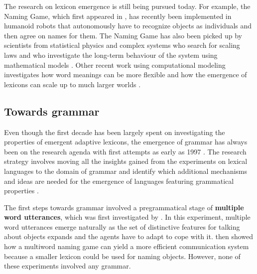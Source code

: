 The research on lexicon emergence is still being pursued today. For example, the Naming Game, which first appeared in \citet{steels97selforganizing}, has recently been implemented in humanoid robots that autonomously have to recognize objects as individuals and then agree on names for them. The Naming Game has also been picked up by scientists from statistical physics and complex systems who search for scaling laws and who investigate the long-term behaviour of the system using mathematical models \citep{baronchelli06sharp, devylder07evolution}. Other recent work using computational modeling investigates how word meanings can be more flexible and how the emergence of lexicons can scale up to much larger worlds \citep{wellens08flexible}.

\subsection{Towards grammar}
\label{s:towards-grammar}

Even though the first decade has been largely spent on investigating the properties of emergent adaptive lexicons, the emergence of grammar has always been on the research agenda with first attempts as early as 1997 \citep{steels97origins-syntax}. The research strategy involves moving all the insights gained from the experiments on lexical languages to the domain of grammar and identify which additional mechanisms and ideas are needed for the emergence of languages featuring grammatical properties \citep{steels05emergence}.

The first steps towards grammar involved a pregrammatical stage of {\bfseries multiple word utterances}, which was first investigated by \citet{steels96emergent}. In this experiment, multiple word utterances emerge naturally as the set of distinctive features for talking about objects expands and the agents have to adapt to cope with it. \citet{vanlooveren05design} then showed how a multiword naming game can yield a more efficient communication system because a smaller lexicon could be used for naming objects. However, none of these experiments involved any grammar.


